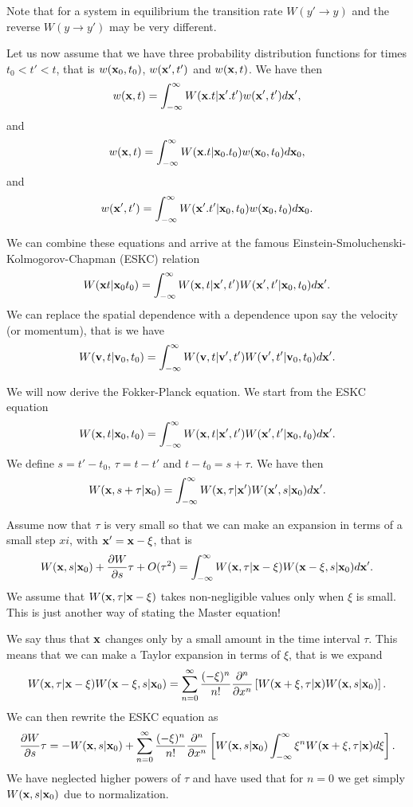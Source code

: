 Note that for a system in equilibrium the transition rate 
$W(y'\rightarrow y)$ and
the reverse $W(y\rightarrow y')$ may be very different. 


Let us now assume that we have three probability distribution functions for times $t_0 < t' < t$, that is
$w({\bf x}_0,t_0)$, $w({\bf x}',t')$ and $w({\bf x},t)$.
We have then  
\[
   w({\bf x},t)= \int_{-\infty}^{\infty} W({\bf x}.t|{\bf x}'.t')w({\bf x}',t')d{\bf x}',
\]
and
\[
   w({\bf x},t)= \int_{-\infty}^{\infty} W({\bf x}.t|{\bf x}_0.t_0)w({\bf x}_0,t_0)d{\bf x}_0,
\]
and
\[
   w({\bf x}',t')= \int_{-\infty}^{\infty} W({\bf x}'.t'|{\bf x}_0,t_0)w({\bf x}_0,t_0)d{\bf x}_0.
\]

We can combine these equations and arrive at the 
famous Einstein-Smoluchenski-Kolmogorov-Chapman (ESKC) relation
\[
 W({\bf x}t|{\bf x}_0t_0)  = \int_{-\infty}^{\infty} W({\bf x},t|{\bf x}',t')W({\bf x}',t'|{\bf x}_0,t_0)d{\bf x}'.
\]
We can replace the spatial dependence with a dependence upon say the velocity
(or momentum), that is we have
\[
 W({\bf v},t|{\bf v}_0,t_0)  = \int_{-\infty}^{\infty} W({\bf v},t|{\bf v}',t')W({\bf v}',t'|{\bf v}_0,t_0)d{\bf x}'.
\]

We will now derive the Fokker-Planck equation. 
We start from the ESKC equation
\[
 W({\bf x},t|{\bf x}_0,t_0)  = \int_{-\infty}^{\infty} W({\bf x},t|{\bf x}',t')W({\bf x}',t'|{\bf x}_0,t_0)d{\bf x}'.
\]
We define $s=t'-t_0$, $\tau=t-t'$ and $t-t_0=s+\tau$. We have then
\[
 W({\bf x},s+\tau|{\bf x}_0)  = \int_{-\infty}^{\infty} W({\bf x},\tau|{\bf x}')W({\bf x}',s|{\bf x}_0)d{\bf x}'.
\]

Assume now that $\tau$ is very small so that we can make an expansion 
in terms of a small step $xi$, with ${\bf x}'={\bf x}-\xi$, that is
\[
 W({\bf x},s|{\bf x}_0)+\frac{\partial W}{\partial s}\tau +O(\tau^2) = \int_{-\infty}^{\infty} W({\bf x},\tau|{\bf x}-\xi)W({\bf x}-\xi,s|{\bf x}_0)d{\bf x}'.
\]
We assume that $W({\bf x},\tau|{\bf x}-\xi)$ takes non-negligible values only when $\xi$ is small. This is just another way of stating the Master equation!

We say thus that ${\bf x}$ changes only by a small amount in the time interval $\tau$. 
This means that we can make a Taylor expansion in terms of $\xi$, that is we
expand
\[
W({\bf x},\tau|{\bf x}-\xi)W({\bf x}-\xi,s|{\bf x}_0) =
\sum_{n=0}^{\infty}\frac{(-\xi)^n}{n!}\frac{\partial^n}{\partial x^n}\left[W({\bf x}+\xi,\tau|{\bf x})W({\bf x},s|{\bf x}_0)
\right].
\]
We can then rewrite the ESKC equation as 
\[
\frac{\partial W}{\partial s}\tau=-W({\bf x},s|{\bf x}_0)+
\sum_{n=0}^{\infty}\frac{(-\xi)^n}{n!}\frac{\partial^n}{\partial x^n}
\left[W({\bf x},s|{\bf x}_0)\int_{-\infty}^{\infty} \xi^nW({\bf x}+\xi,\tau|{\bf x})d\xi\right].
\]
We have neglected higher powers of $\tau$ and have used that for $n=0$ 
we get simply $W({\bf x},s|{\bf x}_0)$ due to normalization.

